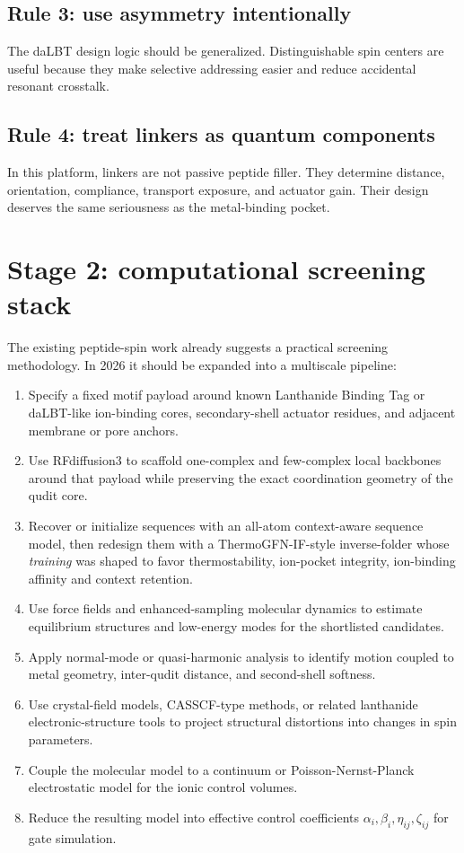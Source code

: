 \documentclass[11pt]{report}
\newcommand{\lbt}{Lanthanide Binding Tag}
\newcommand{\dalbt}{daLBT}
\theoremstyle{definition}
\begin{document}
\subsection{Rule 3: use asymmetry intentionally}
The \dalbt{} design logic should be generalized. Distinguishable spin centers are useful because they make selective addressing easier and reduce accidental resonant crosstalk.

\subsection{Rule 4: treat linkers as quantum components}
In this platform, linkers are not passive peptide filler. They determine distance, orientation, compliance, transport exposure, and actuator gain. Their design deserves the same seriousness as the metal-binding pocket.

\section{Stage 2: computational screening stack}
The existing peptide-spin work already suggests a practical screening methodology. In 2026 it should be expanded into a multiscale pipeline:

\begin{enumerate}[leftmargin=2em]
\item Specify a fixed motif payload around known \lbt{} or \dalbt{}-like ion-binding cores, secondary-shell actuator residues, and adjacent membrane or pore anchors.
\item Use RFdiffusion3 to scaffold one-complex and few-complex local backbones around that payload while preserving the exact coordination geometry of the qudit core.
\item Recover or initialize sequences with an all-atom context-aware sequence model, then redesign them with a ThermoGFN-IF-style inverse-folder whose \emph{training} was shaped to favor thermostability, ion-pocket integrity, ion-binding affinity and context retention. 
\item Use force fields and enhanced-sampling molecular dynamics to estimate equilibrium structures and low-energy modes for the shortlisted candidates.
\item Apply normal-mode or quasi-harmonic analysis to identify motion coupled to metal geometry, inter-qudit distance, and second-shell softness.
\item Use crystal-field models, CASSCF-type methods, or related lanthanide electronic-structure tools to project structural distortions into changes in spin parameters.
\item Couple the molecular model to a continuum or Poisson-Nernst-Planck electrostatic model for the ionic control volumes.
\item Reduce the resulting model into effective control coefficients $\alpha_i,\beta_i,\eta_{ij},\zeta_{ij}$ for gate simulation.
\end{enumerate}
\end{document}
